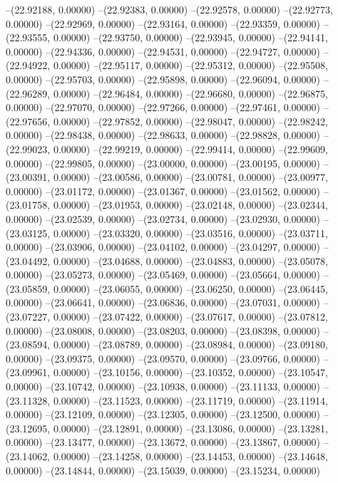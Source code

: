 --(22.92188, 0.00000)
--(22.92383, 0.00000)
--(22.92578, 0.00000)
--(22.92773, 0.00000)
--(22.92969, 0.00000)
--(22.93164, 0.00000)
--(22.93359, 0.00000)
--(22.93555, 0.00000)
--(22.93750, 0.00000)
--(22.93945, 0.00000)
--(22.94141, 0.00000)
--(22.94336, 0.00000)
--(22.94531, 0.00000)
--(22.94727, 0.00000)
--(22.94922, 0.00000)
--(22.95117, 0.00000)
--(22.95312, 0.00000)
--(22.95508, 0.00000)
--(22.95703, 0.00000)
--(22.95898, 0.00000)
--(22.96094, 0.00000)
--(22.96289, 0.00000)
--(22.96484, 0.00000)
--(22.96680, 0.00000)
--(22.96875, 0.00000)
--(22.97070, 0.00000)
--(22.97266, 0.00000)
--(22.97461, 0.00000)
--(22.97656, 0.00000)
--(22.97852, 0.00000)
--(22.98047, 0.00000)
--(22.98242, 0.00000)
--(22.98438, 0.00000)
--(22.98633, 0.00000)
--(22.98828, 0.00000)
--(22.99023, 0.00000)
--(22.99219, 0.00000)
--(22.99414, 0.00000)
--(22.99609, 0.00000)
--(22.99805, 0.00000)
--(23.00000, 0.00000)
--(23.00195, 0.00000)
--(23.00391, 0.00000)
--(23.00586, 0.00000)
--(23.00781, 0.00000)
--(23.00977, 0.00000)
--(23.01172, 0.00000)
--(23.01367, 0.00000)
--(23.01562, 0.00000)
--(23.01758, 0.00000)
--(23.01953, 0.00000)
--(23.02148, 0.00000)
--(23.02344, 0.00000)
--(23.02539, 0.00000)
--(23.02734, 0.00000)
--(23.02930, 0.00000)
--(23.03125, 0.00000)
--(23.03320, 0.00000)
--(23.03516, 0.00000)
--(23.03711, 0.00000)
--(23.03906, 0.00000)
--(23.04102, 0.00000)
--(23.04297, 0.00000)
--(23.04492, 0.00000)
--(23.04688, 0.00000)
--(23.04883, 0.00000)
--(23.05078, 0.00000)
--(23.05273, 0.00000)
--(23.05469, 0.00000)
--(23.05664, 0.00000)
--(23.05859, 0.00000)
--(23.06055, 0.00000)
--(23.06250, 0.00000)
--(23.06445, 0.00000)
--(23.06641, 0.00000)
--(23.06836, 0.00000)
--(23.07031, 0.00000)
--(23.07227, 0.00000)
--(23.07422, 0.00000)
--(23.07617, 0.00000)
--(23.07812, 0.00000)
--(23.08008, 0.00000)
--(23.08203, 0.00000)
--(23.08398, 0.00000)
--(23.08594, 0.00000)
--(23.08789, 0.00000)
--(23.08984, 0.00000)
--(23.09180, 0.00000)
--(23.09375, 0.00000)
--(23.09570, 0.00000)
--(23.09766, 0.00000)
--(23.09961, 0.00000)
--(23.10156, 0.00000)
--(23.10352, 0.00000)
--(23.10547, 0.00000)
--(23.10742, 0.00000)
--(23.10938, 0.00000)
--(23.11133, 0.00000)
--(23.11328, 0.00000)
--(23.11523, 0.00000)
--(23.11719, 0.00000)
--(23.11914, 0.00000)
--(23.12109, 0.00000)
--(23.12305, 0.00000)
--(23.12500, 0.00000)
--(23.12695, 0.00000)
--(23.12891, 0.00000)
--(23.13086, 0.00000)
--(23.13281, 0.00000)
--(23.13477, 0.00000)
--(23.13672, 0.00000)
--(23.13867, 0.00000)
--(23.14062, 0.00000)
--(23.14258, 0.00000)
--(23.14453, 0.00000)
--(23.14648, 0.00000)
--(23.14844, 0.00000)
--(23.15039, 0.00000)
--(23.15234, 0.00000)
